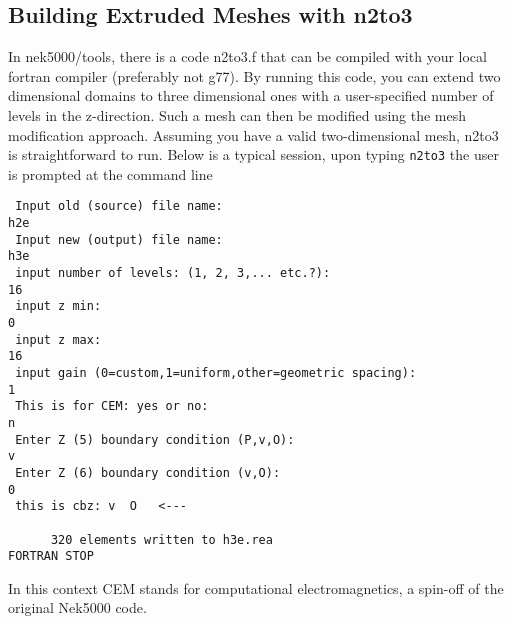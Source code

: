 \subsection{Building Extruded Meshes with n2to3}

In nek5000/tools, there is a code n2to3.f that can be compiled with your
local fortran compiler (preferably not g77).
By running this code, you can extend two dimensional domains to
three dimensional ones with a user-specified number of levels in the
z-direction.  Such a mesh can then be modified using the mesh modification
approach. Assuming you have a valid two-dimensional mesh, n2to3 is straightforward
to run.  Below is a typical session, upon typing {\tt n2to3} the user is prompted at the command line

\begin{verbatim}
 Input old (source) file name:
h2e
 Input new (output) file name:
h3e
 input number of levels: (1, 2, 3,... etc.?):
16
 input z min:
0
 input z max:
16
 input gain (0=custom,1=uniform,other=geometric spacing):
1
 This is for CEM: yes or no:
n
 Enter Z (5) boundary condition (P,v,O):
v
 Enter Z (6) boundary condition (v,O):
0
 this is cbz: v  O   <---

      320 elements written to h3e.rea
FORTRAN STOP
\end{verbatim}

In this context CEM stands for computational electromagnetics, a spin-off of the original Nek5000 code.



